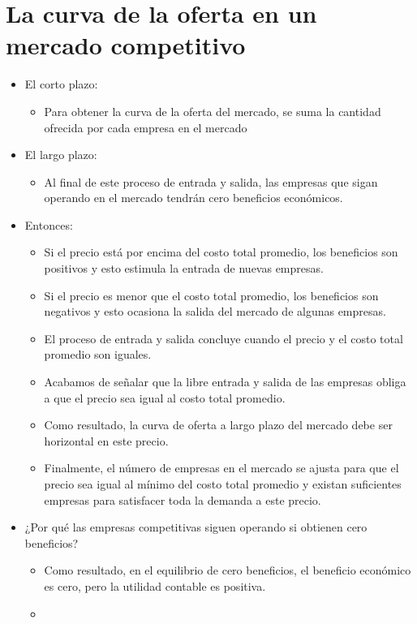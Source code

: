 \documentclass{article}
\begin{document}
\section{La curva de la oferta en un mercado competitivo}
\begin{itemize}
    \item El corto plazo:
        \begin{itemize}
            \item  Para obtener la curva de la oferta del mercado, se suma la cantidad ofrecida por cada empresa en el mercado
        \end{itemize}
    
    \item El largo plazo: 
        \begin{itemize}
            \item Al final de este proceso de entrada y salida, las empresas que sigan operando en el mercado tendrán cero beneficios económicos.
        \end{itemize}
    
    \item Entonces: 
        \begin{itemize}
            \item Si el precio está por encima del costo total promedio, los beneficios son positivos y esto estimula la entrada de nuevas empresas. 
            \item Si el precio es menor que el costo total promedio, los beneficios son negativos y esto ocasiona la salida del mercado de algunas empresas. 
            \item El proceso de entrada y salida concluye cuando el precio y el costo total promedio son iguales.
            \item Acabamos de señalar que la libre entrada y salida de las empresas obliga a que el precio sea igual al costo total promedio.
            \item Como resultado, la curva de oferta a largo plazo del mercado debe ser horizontal en este precio.
            \item Finalmente, el número de empresas en el mercado se ajusta para que el precio sea igual al mínimo del costo total promedio y existan suficientes empresas para satisfacer toda la demanda a este precio. 
        \end{itemize}
    
    \item ¿Por qué las empresas competitivas siguen operando si obtienen cero beneficios?
        \begin{itemize}
            \item  Como resultado, en el equilibrio de cero beneficios, el beneficio económico es cero, pero la utilidad contable es positiva.
            \item {} 
        \end{itemize}
    

\end{itemize}
\end{document}
